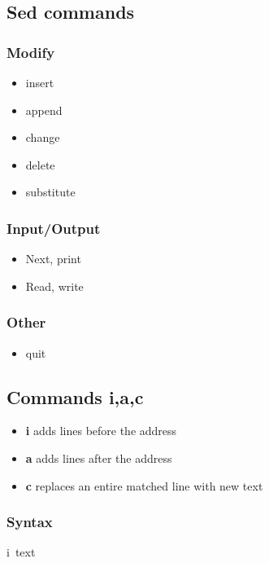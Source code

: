 \documentclass{report}
\begin{document}
    \subsection{Sed commands}
    \bigbreak \noindent 
    \subsubsection{Modify}
    \begin{itemize}
        \item insert 
        \item append
        \item change
        \item delete
        \item substitute
    \end{itemize}

    \bigbreak \noindent 
    \subsubsection{Input/Output}
    \begin{itemize}
        \item Next, print
        \item Read, write
    \end{itemize}

    \bigbreak \noindent 
    \subsubsection{Other}
    \begin{itemize}
        \item quit
    \end{itemize}

    \bigbreak \noindent 
    \subsection{Commands i,a,c}
    \begin{itemize}
        \item \textbf{i} adds lines before the address
        \item \textbf{a} adds lines after the address
        \item \textbf{c} replaces an entire matched line with new text
    \end{itemize}
    \bigbreak \noindent 
    \subsubsection{Syntax}
    \bigbreak \noindent 
    \begin{bashcode}
        [address] i\
        text
    \end{bashcode}
\end{document}
